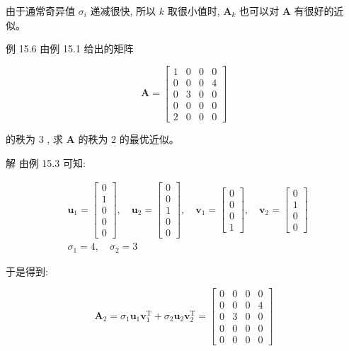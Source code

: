 \documentclass[10pt]{article}
\begin{document}
由于通常奇异值 $\sigma_{i}$ 递减很快, 所以 $k$ 取很小值时, $\boldsymbol{A}_{k}$ 也可以对 $\boldsymbol{A}$ 有很好的近似。

例 15.6 由例 15.1 给出的矩阵

$$
\boldsymbol{A}=\left[\begin{array}{llll}
1 & 0 & 0 & 0 \\
0 & 0 & 0 & 4 \\
0 & 3 & 0 & 0 \\
0 & 0 & 0 & 0 \\
2 & 0 & 0 & 0
\end{array}\right]
$$

的秩为 3 , 求 $\boldsymbol{A}$ 的秩为 2 的最优近似。

解 由例 15.3 可知:

$$
\begin{aligned}
& \boldsymbol{u}_{1}=\left[\begin{array}{l}
0 \\
1 \\
0 \\
0 \\
0
\end{array}\right], \quad \boldsymbol{u}_{2}=\left[\begin{array}{l}
0 \\
0 \\
1 \\
0 \\
0
\end{array}\right], \quad \boldsymbol{v}_{1}=\left[\begin{array}{l}
0 \\
0 \\
0 \\
1
\end{array}\right], \quad \boldsymbol{v}_{2}=\left[\begin{array}{l}
0 \\
1 \\
0 \\
0
\end{array}\right] \\
& \sigma_{1}=4, \quad \sigma_{2}=3
\end{aligned}
$$

于是得到:

$$
\boldsymbol{A}_{2}=\sigma_{1} \boldsymbol{u}_{1} \boldsymbol{v}_{1}^{\mathrm{T}}+\sigma_{2} \boldsymbol{u}_{2} \boldsymbol{v}_{2}^{\mathrm{T}}=\left[\begin{array}{cccc}
0 & 0 & 0 & 0 \\
0 & 0 & 0 & 4 \\
0 & 3 & 0 & 0 \\
0 & 0 & 0 & 0 \\
0 & 0 & 0 & 0
\end{array}\right]
$$
\end{document}
